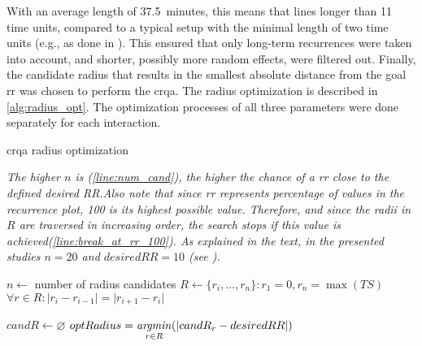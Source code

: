 With an average length of \SI{37.5}{minutes}, this means that lines longer than 11 time units, compared to a typical setup with the minimal length of two time units (e.g., as done in \citet{Borrie2019syncing}).
This ensured that only long-term recurrences were taken into account, and shorter, possibly more random effects, were filtered out.
Finally, the candidate radius that results in the smallest absolute distance from the goal \ac{rr} was chosen to perform the \ac{crqa}.
The radius optimization is described in \cref{alg:radius_opt}.
The optimization processes of all three parameters were done separately for each interaction.
%
\begin{algorithm}[t]
	\addtocounter{myequations}{1}
	\setcounter{myequations}{13}
	\caption{\acs{crqa} radius optimization}
	\label{alg:radius_opt}
	\algorithmcaption
		{\emph{The higher $n$ is (\cref{line:num_cand}), the higher the chance of a \ac{rr} close to the defined \emph{desired RR}.Also note that since \ac{rr} represents percentage of values in the recurrence plot, 100 is its highest possible value.
		Therefore, and since the radii in $R$ are traversed in increasing order, the search stops if this value is achieved(\cref{line:break_at_rr_100}).
		As explained in the text, in the presented studies $n = 20$ and $desiredRR = 10$ (see \citet{Coco2014crqa-r}).}}
	\DontPrintSemicolon
	
	
	$n \gets$ number of radius candidates \label{line:num_cand}\;
	$R \gets \{r_i, \ldots, r_n\} : r_1 = 0, r_n = \max(TS)$\;
	$\forall r \in R : \lvert r_i - r_{i-1} \rvert = \lvert r_{i+1} - r_i \rvert$ 
	
	$candR \gets \varnothing$\;
	$optRadius = \displaystyle\operatorname*{\mathit{argmin}}_{r \in R}(\lvert candR_r - desiredRR \rvert)$\;
\end{algorithm}

